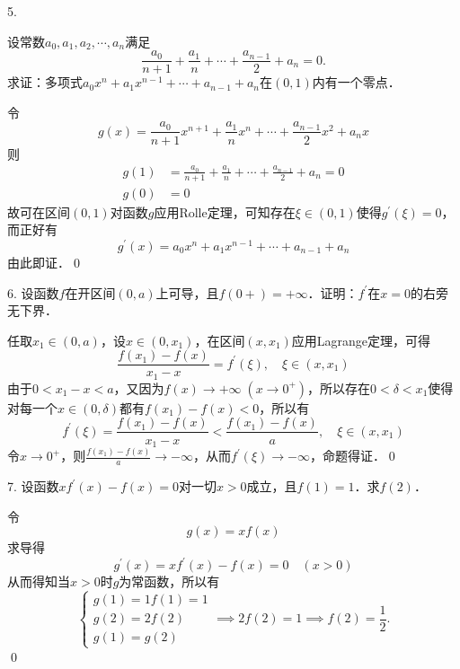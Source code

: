 5. \begin{minipage}[t]{0.8\textwidth}
设常数$a_0,a_1,a_2,\cdots, a_n$满足
\begin{equation*}
    \frac{a_0}{n+1}+\frac{a_1}{n}+\cdots +\frac{a_{n-1}}{2}+a_n = 0.
\end{equation*}
求证：多项式$a_0 x^n + a_1 x^{n-1} + \cdots + a_{n-1} + a_n$在$(0,1)$内有一个零点．
\end{minipage}
\bigskip

\prove 令
\begin{equation}
    g(x) = \frac{a_0}{n+1} x^{n+1} + \frac{a_1}{n} x^n + \cdots + \frac{a_{n-1}}{2} x^2 + a_n x
\end{equation}
则
\begin{align}
    g(1) &= \frac{a_0}{n+1}+\frac{a_1}{n}+\cdots +\frac{a_{n-1}}{2}+a_n = 0 \\
    g(0) &= 0
\end{align}
故可在区间$(0,1)$对函数$g$应用Rolle定理，可知存在$\xi \in (0,1)$使得$g^{\prime}(\xi)=0$，而正好有
\begin{equation}
    g^{\prime}(x) = a_0 x^n + a_1 x^{n-1} + \cdots + a_{n-1} + a_n
\end{equation}
由此即证．\qed\bigskip

6. 设函数$f$在开区间$(0,a)$上可导，且$f(0+)=+\infty$．证明：$f^\prime$在$x=0$的右旁无下界．

\prove 任取$x_1 \in (0,a)$，设$x \in (0, x_1)$，在区间$(x,x_1)$应用Lagrange定理，可得
\begin{equation}
    \frac{f(x_1)-f(x)}{x_1-x} = f^{\prime}(\xi), \quad \xi \in (x, x_1)
\end{equation}
由于$0 < x_1-x < a$，又因为$f(x) \to +\infty \; (x \to 0^+)$，所以存在$0<\delta<x_1$使得对每一个$x \in (0,\delta)$都有$f(x_1)-f(x)<0$，所以有
\begin{equation}
    f^{\prime}(\xi) = \frac{f(x_1)-f(x)}{x_1-x} < \frac{f(x_1)-f(x)}{a}, \quad \xi \in (x, x_1)
\end{equation}
令$x \to 0^+$，则$\displaystyle\frac{f(x_1)-f(x)}{a} \to -\infty$，从而$f^{\prime}(\xi) \to -\infty$，命题得证．\qed\bigskip

7. 设函数$x f^{\prime} (x) - f(x) = 0$对一切$x > 0$成立，且$f(1)=1$．求$f(2)$．

\solve 令
\begin{equation}
    g(x) = xf(x)
\end{equation}
求导得
\begin{equation}
    g^{\prime}(x) = x f^\prime (x) - f(x) = 0 \quad (x > 0)
\end{equation}
从而得知当$x > 0$时$g$为常函数，所以有
\begin{equation}
    \begin{cases}
        g(1) = 1 f(1) = 1 \\
        g(2) = 2 f(2) \\
        g(1) = g(2)
    \end{cases} \implies 2 f(2) = 1 \implies f(2) = \frac{1}{2}.
\end{equation}
\qed\bigskip

